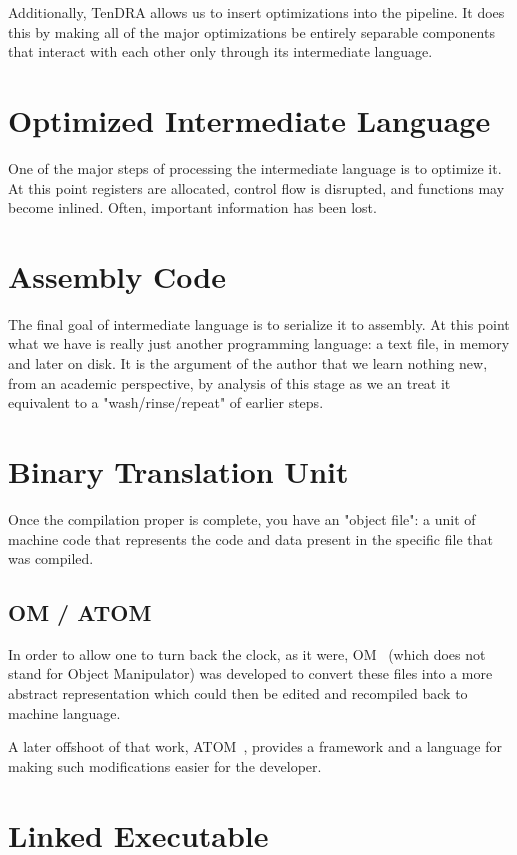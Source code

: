 \documentclass[12pt]{article}
\begin{document}
Additionally, TenDRA allows us to insert optimizations into the pipeline. It does this by making all of the major optimizations be entirely separable components that interact with each other only through its intermediate language.

\section{Optimized Intermediate Language}

One of the major steps of processing the intermediate language is to optimize it. At this point registers are allocated, control flow is disrupted, and functions may become inlined. Often, important information has been lost.

\section{Assembly Code}

The final goal of intermediate language is to serialize it to assembly. At this point what we have is really just another programming language: a text file, in memory and later on disk. It is the argument of the author that we learn nothing new, from an academic perspective, by analysis of this stage as we an treat it equivalent to a "wash/rinse/repeat" of earlier steps.

\section{Binary Translation Unit}

Once the compilation proper is complete, you have an "object file": a unit of machine code that represents the code and data present in the specific file that was compiled.

\subsection{OM / ATOM}

In order to allow one to turn back the clock, as it were, OM~\cite{om} (which does not stand for Object Manipulator) was developed to convert these files into a more abstract representation which could then be edited and recompiled back to machine language.

A later offshoot of that work, ATOM~\cite{atom}, provides a framework and a language for making such modifications easier for the developer.

\section{Linked Executable}
\end{document}
